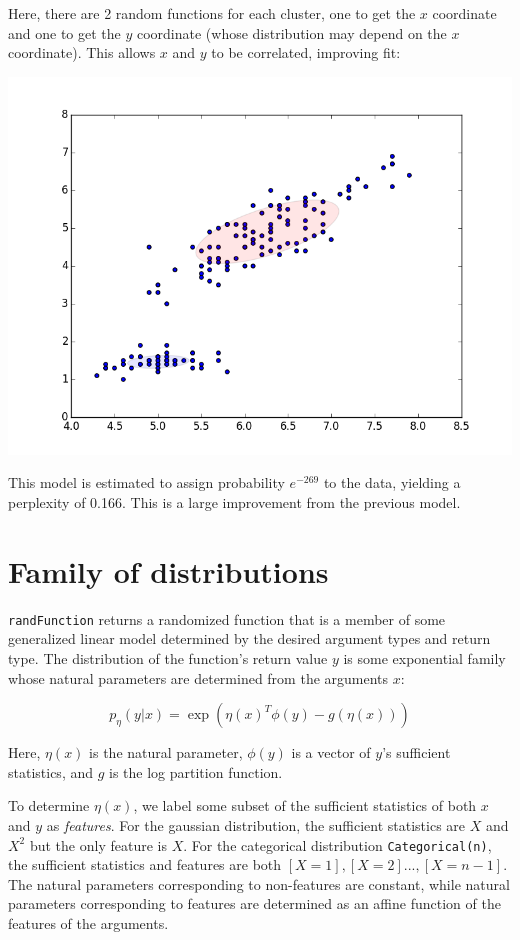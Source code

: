 \documentclass{article}
\begin{document}
  Here, there are 2 random functions for each cluster, one to get the $x$ coordinate and one to get the $y$ coordinate (whose distribution may depend on the $x$ coordinate).  This allows $x$ and $y$ to be correlated, improving fit:

  \begin{center}
    \includegraphics[scale=0.5]{../plots/irisclusters_dep.png}
  \end{center}

  This model is estimated to assign probability $e^{-269}$ to the data, yielding a perplexity of 0.166.  This is a large improvement from the previous model.


  \section{Family of distributions}
  
    
    \texttt{randFunction} returns a randomized function that is a member of some generalized linear model
    determined by the desired argument types and return type.
    The distribution
    of the function's return value $y$
    is some exponential family whose natural
    parameters are determined from the arguments $x$:

    $$p_{\eta}(y | x) = \exp\left(\eta(x)^T \phi(y) - g(\eta(x))\right)$$

    Here, $\eta(x)$ is the natural parameter, $\phi(y)$ is a vector of $y$'s sufficient statistics,
    and $g$ is the log partition function.

    To determine $\eta(x)$, we label
    some subset of the sufficient statistics of both $x$ and $y$ as \emph{features}.  For the gaussian
    distribution, the sufficient statistics are $X$ and $X^2$ but the only feature is $X$.  For the
    categorical distribution \texttt{Categorical(n)}, the sufficient statistics
    and features are both $[X = 1], [X = 2] ..., [X=n - 1]$.
    The natural
    parameters corresponding to non-features are constant, while natural
    parameters corresponding to features are determined as an affine
    function of the features of the arguments.
\end{document}

